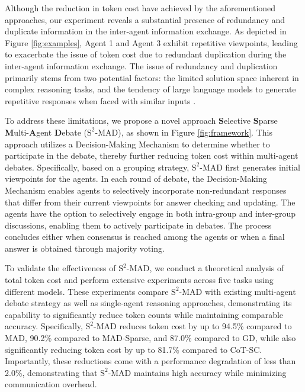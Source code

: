 Although the reduction in token cost have achieved by the aforementioned approaches, our experiment reveals a substantial presence of redundancy and duplicate information in the inter-agent information exchange. As depicted in Figure \ref{fig:examples}, Agent 1 and Agent 3 exhibit repetitive viewpoints, leading to exacerbate the issue of token cost due to redundant duplication during the inter-agent information exchange. The issue of redundancy and duplication primarily stems from two potential factors: the limited solution space inherent in complex reasoning tasks, and the tendency of large language models to generate repetitive responses when faced with similar inputs \citep{holtzman2019curious,xu2022learning,yan2023understanding}.

To address these limitations, we propose a novel approach \textbf{S}elective \textbf{S}parse \textbf{M}ulti-\textbf{A}gent \textbf{D}ebate (\({\text{S}^2\text{-MAD}}\)), as shown in Figure \ref{fig:framework}. This approach utilizes a Decision-Making Mechanism to determine whether to participate in the debate, thereby further reducing token cost within multi-agent debates. Specifically, based on a grouping strategy, \({\text{S}^2\text{-MAD}}\) first generates initial viewpoints for the agents. In each round of debate, the Decision-Making Mechanism enables agents to selectively incorporate non-redundant responses that differ from their current viewpoints for answer checking and updating. The agents have the option to selectively engage in both intra-group and inter-group discussions, enabling them to actively participate in debates. The process concludes either when consensus is reached among the agents or when a final answer is obtained through majority voting.

To validate the effectiveness of \({\text{S}^2\text{-MAD}}\), we conduct a theoretical analysis of total token cost and perform extensive experiments across five tasks using different models. These experiments compare \({\text{S}^2\text{-MAD}}\) with existing multi-agent debate strategy as well as single-agent reasoning approaches, demonstrating its capability to significantly reduce token counts while maintaining comparable accuracy. Specifically, \({\text{S}^2\text{-MAD}}\) reduces token cost by up to 94.5\% compared to MAD, 90.2\% compared to MAD-Sparse, and 87.0\% compared to GD, while also significantly reducing token cost by up to 81.7\% compared to CoT-SC.  Importantly, these reductions come with a performance degradation of less than 2.0\%, demonstrating that \({\text{S}^2\text{-MAD}}\) maintains high accuracy while minimizing communication overhead. 

